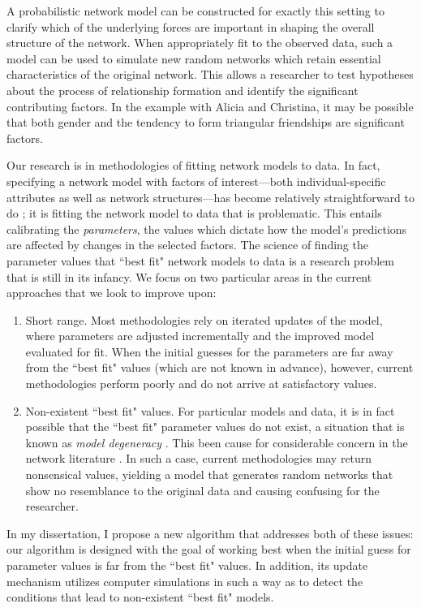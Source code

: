 \documentclass[12pt]{article}
\begin{document}
A probabilistic network model can be constructed for exactly this setting
to clarify which of the underlying forces are important in shaping the 
overall structure of the network.  
When appropriately fit to the observed data, such a model can be used to 
simulate new random networks which retain essential characteristics of 
the original network.  This allows a researcher to 
test hypotheses about the process of relationship formation and identify the
significant contributing factors.  In the example with Alicia and Christina, it 
may be possible that both gender and the tendency to form triangular 
friendships are significant factors.

Our research is in methodologies of fitting network models to data.  
In fact, specifying a network model with factors of interest---both 
individual-specific attributes as well as network structures---has become 
relatively straightforward to do \citep{Wasserman:1996}; it is fitting
the network model to data that is problematic.  This entails calibrating 
the \emph{parameters}, the values which dictate how the model's predictions 
are affected by changes in the selected factors.  The science of finding 
the parameter values that ``best fit" network models to 
data is a research problem that is still in its infancy.  
We focus on two particular areas in the current approaches that we look 
to improve upon:
\begin{enumerate}
\item Short range.  Most methodologies rely on iterated updates of the model, 
where parameters are  adjusted incrementally and the improved model evaluated 
for fit.  When the initial guesses for the parameters are far away from the 
``best fit" values (which are not known in advance), however, current 
methodologies perform poorly and do not arrive at satisfactory values.
\item Non-existent ``best fit" values.  For particular models and data, it is 
in fact possible that the ``best fit" parameter values do not exist, a situation 
that is known as \emph{model degeneracy} \citep{Handcock:degeneracy,Rinaldo:2009}.  
This been cause for considerable concern in the network literature 
\citep{advancesp*,recentp*,statnet-tutorial}.  In such a case, current 
methodologies may return nonsensical values, yielding a model that generates 
random networks that show no resemblance to the original data and causing 
confusing for the researcher.
\end{enumerate}
In my dissertation, I propose a new algorithm that addresses both of these 
issues: our algorithm is designed with the goal of working best when the initial 
guess for parameter values is far from the ``best fit" values.  In addition, its 
update mechanism utilizes computer simulations  in such a way as 
to detect the conditions that lead to non-existent ``best fit" models.
\end{document}
